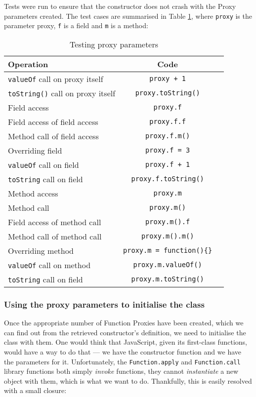 Tests were run to ensure that the constructor does not crash with the Proxy parameters created. The test cases are summarised in Table \ref{nocrash}, where \texttt{proxy} is the parameter proxy, \texttt{f} is a field and \texttt{m} is a method:

\begin{table}[h]
\centering
\begin{tabular}{|l|c|c|}
\hline
\textbf{Operation} & \textbf{Code} \\
\hline
\texttt{valueOf} call on proxy itself & \texttt{proxy + 1}\\
\texttt{toString()} call on proxy itself & \texttt{proxy.toString()}\\
Field access & \texttt{proxy.f} \\
Field access of field access & \texttt{proxy.f.f} \\
Method call of field access & \texttt{proxy.f.m()} \\
Overriding field & \texttt{proxy.f = 3} \\
\texttt{valueOf} call on field & \texttt{proxy.f + 1} \\
\texttt{toString} call on field & \texttt{proxy.f.toString()} \\
Method access & \texttt{proxy.m} \\
Method call & \texttt{proxy.m()} \\
Field access of method call & \texttt{proxy.m().f} \\
Method call of method call & \texttt{proxy.m().m()} \\
Overriding method & \texttt{proxy.m = function()\{\}} \\
\texttt{valueOf} call on method & \texttt{proxy.m.valueOf()} \\
\texttt{toString} call on field & \texttt{proxy.m.toString()} \\
\hline
\end{tabular}
\caption{Testing proxy parameters}
\label{nocrash}
\end{table}

\subsubsection{Using the proxy parameters to initialise the class}
Once the appropriate number of Function Proxies have been created, which we can find out from the retrieved constructor's definition, we need to initialise the class with them. One would think that JavaScript, given its first-class functions, would have a way to do that --- we have the constructor function and we have the parameters for it. Unfortunately, the \texttt{Function.apply} and \texttt{Function.call} library functions both simply \emph{invoke} functions, they cannot \emph{instantiate} a new object with them, which is what we want to do. Thankfully, this is easily resolved with a small closure:

